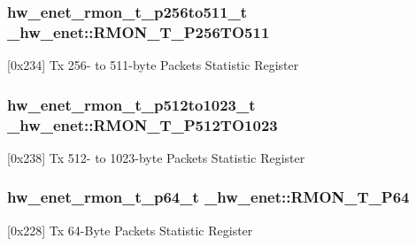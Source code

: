\subsubsection[{\texorpdfstring{R\+M\+O\+N\+\_\+\+T\+\_\+\+P256\+T\+O511}{RMON_T_P256TO511}}]{ {\bf hw\+\_\+enet\+\_\+rmon\+\_\+t\+\_\+p256to511\+\_\+t} \+\_\+hw\+\_\+enet\+::\+R\+M\+O\+N\+\_\+\+T\+\_\+\+P256\+T\+O511}\hypertarget{struct__hw__enet_a9d0e06248657c94cbb97aa71a0e9e897}{}\label{struct__hw__enet_a9d0e06248657c94cbb97aa71a0e9e897}
\mbox{[}0x234\mbox{]} Tx 256-\/ to 511-\/byte Packets Statistic Register 
\subsubsection[{\texorpdfstring{R\+M\+O\+N\+\_\+\+T\+\_\+\+P512\+T\+O1023}{RMON_T_P512TO1023}}]{ {\bf hw\+\_\+enet\+\_\+rmon\+\_\+t\+\_\+p512to1023\+\_\+t} \+\_\+hw\+\_\+enet\+::\+R\+M\+O\+N\+\_\+\+T\+\_\+\+P512\+T\+O1023}\hypertarget{struct__hw__enet_acce741bbd14aff608e0c0103485d0b89}{}\label{struct__hw__enet_acce741bbd14aff608e0c0103485d0b89}
\mbox{[}0x238\mbox{]} Tx 512-\/ to 1023-\/byte Packets Statistic Register 
\subsubsection[{\texorpdfstring{R\+M\+O\+N\+\_\+\+T\+\_\+\+P64}{RMON_T_P64}}]{ {\bf hw\+\_\+enet\+\_\+rmon\+\_\+t\+\_\+p64\+\_\+t} \+\_\+hw\+\_\+enet\+::\+R\+M\+O\+N\+\_\+\+T\+\_\+\+P64}\hypertarget{struct__hw__enet_a78bc03d1e1f18c7397782f9684c3d837}{}\label{struct__hw__enet_a78bc03d1e1f18c7397782f9684c3d837}
\mbox{[}0x228\mbox{]} Tx 64-\/\+Byte Packets Statistic Register 
